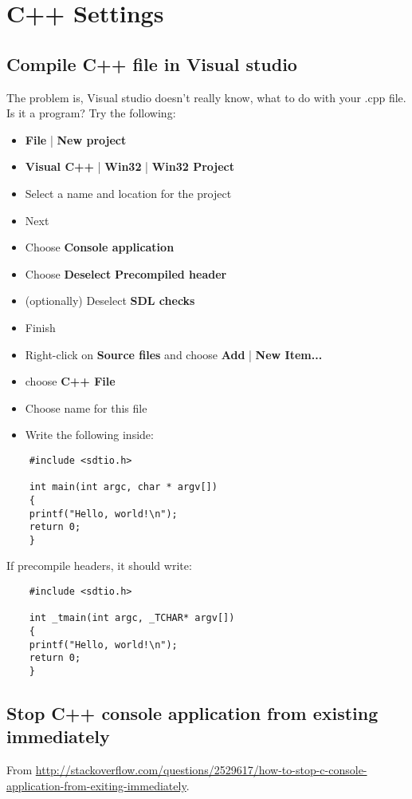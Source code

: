 	\chapter{C++ Settings}

	\section{Compile C++ file in Visual studio}
	The problem is, Visual studio doesn't really know, what to do with your .cpp file. Is it a program? Try the following:\\
	
	\begin{itemize}
		\item \textbf{File} | \textbf{New project}
		\item \textbf{Visual C++} | \textbf{Win32} | \textbf{Win32 Project}
		\item Select a name and location for the project
		\item Next
		\item Choose \textbf{Console application}
		\item Choose \textbf{Deselect} \textbf{Precompiled header}
		\item (optionally) Deselect \textbf{SDL checks}
		\item Finish
		\item Right-click on \textbf{Source files} and choose \textbf{Add} | \textbf{New Item...}
		\item choose \textbf{C++ File}
		\item Choose name for this file
		\item Write the following inside:
	\end{itemize}
	
	\begin{verbatim}
	#include <sdtio.h>
	
	int main(int argc, char * argv[])
	{
	printf("Hello, world!\n");
	return 0;
	}
	\end{verbatim}
	
	If precompile headers, it should write:
	\begin{verbatim}
	#include <sdtio.h>
	
	int _tmain(int argc, _TCHAR* argv[])
	{
	printf("Hello, world!\n");
	return 0;
	}
	\end{verbatim}
	
	
	


	\section{Stop C++ console application from  existing immediately}
	From \url{http://stackoverflow.com/questions/2529617/how-to-stop-c-console-application-from-exiting-immediately}.\\
	
